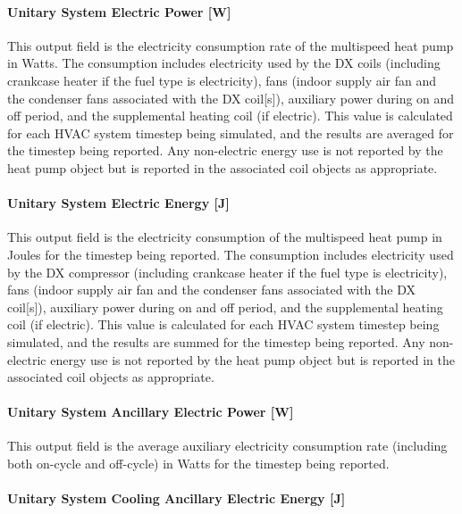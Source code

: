 \paragraph{Unitary System Electric Power {[}W{]}}\label{unitary-system-electric-power-w-1}

This output field is the electricity consumption rate of the multispeed heat pump in Watts. The consumption includes electricity used by the DX coils (including crankcase heater if the fuel type is electricity), fans (indoor supply air fan and the condenser fans associated with the DX coil{[}s{]}), auxiliary power during on and off period, and the supplemental heating coil (if electric). This value is calculated for each HVAC system timestep being simulated, and the results are averaged for the timestep being reported. Any non-electric energy use is not reported by the heat pump object but is reported in the associated coil objects as appropriate.

\paragraph{Unitary System Electric Energy {[}J{]}}\label{unitary-system-electric-energy-j-1}

This output field is the electricity consumption of the multispeed heat pump in Joules for the timestep being reported. The consumption includes electricity used by the DX compressor (including crankcase heater if the fuel type is electricity), fans (indoor supply air fan and the condenser fans associated with the DX coil{[}s{]}), auxiliary power during on and off period, and the supplemental heating coil (if electric). This value is calculated for each HVAC system timestep being simulated, and the results are summed for the timestep being reported. Any non-electric energy use is not reported by the heat pump object but is reported in the associated coil objects as appropriate.

\paragraph{Unitary System Ancillary Electric Power {[}W{]}}\label{unitary-system-ancillary-electric-power-w-1}

This output field is the average auxiliary electricity consumption rate (including both on-cycle and off-cycle) in Watts for the timestep being reported.

\paragraph{Unitary System Cooling Ancillary Electric Energy {[}J{]}}\label{unitary-system-cooling-ancillary-electric-energy-j-1}

